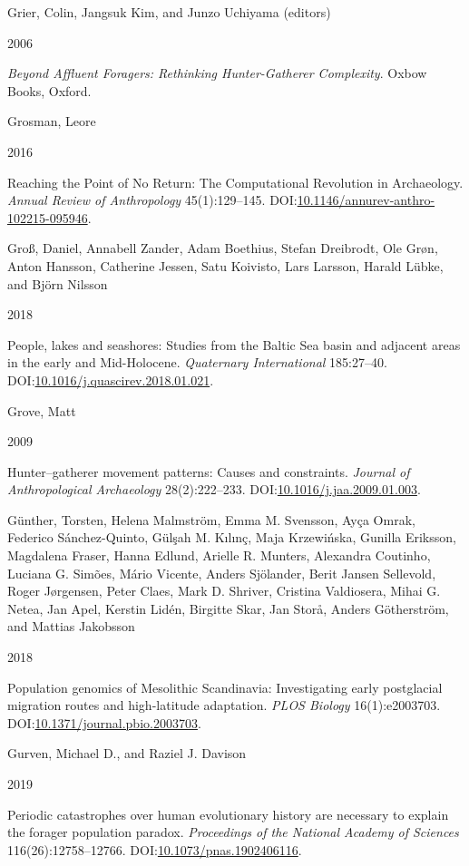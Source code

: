 \documentclass[
  12pt,
  a4paper,
  oneside]{book}
\newlength{\cslhangindent}
\newlength{\csllabelwidth}
\newlength{\cslentryspacingunit} %
\newenvironment{CSLReferences}[2] %
 {%
  \setlength{\parindent}{0pt}
  \ifodd #1
  \let\oldpar\par
  \def\par{\hangindent=\cslhangindent\oldpar}
  \fi
  \setlength{\parskip}{#2\cslentryspacingunit}
 }%
 {}
\newcommand{\CSLBlock}[1]{#1\hfill\break}
\newcommand{\CSLLeftMargin}[1]{\parbox[t]{\csllabelwidth}{#1}}
\newcommand{\CSLRightInline}[1]{\parbox[t]{\linewidth - \csllabelwidth}{#1}\break}
\begin{document}
\begin{CSLReferences}{0}{0}
\leavevmode{}%
\CSLBlock{Grier, Colin, Jangsuk Kim, and Junzo Uchiyama (editors)}
\CSLLeftMargin{ 2006}
\CSLRightInline{\emph{{Beyond Affluent Foragers: Rethinking Hunter-Gatherer Complexity}}. Oxbow Books, Oxford.}

\leavevmode{}%
\CSLBlock{Grosman, Leore}
\CSLLeftMargin{ 2016}
\CSLRightInline{{Reaching the Point of No Return: The Computational Revolution in Archaeology}. \emph{Annual Review of Anthropology} 45(1):129--145. DOI:\href{https://doi.org/10.1146/annurev-anthro-102215-095946}{10.1146/annurev-anthro-102215-095946}.}

\leavevmode{}%
\CSLBlock{Groß, Daniel, Annabell Zander, Adam Boethius, Stefan Dreibrodt, Ole Grøn, Anton Hansson, Catherine Jessen, Satu Koivisto, Lars Larsson, Harald Lübke, and Björn Nilsson}
\CSLLeftMargin{ 2018}
\CSLRightInline{People, lakes and seashores: Studies from the Baltic Sea basin and adjacent areas in the early and Mid-Holocene. \emph{Quaternary International} 185:27--40. DOI:\href{https://doi.org/10.1016/j.quascirev.2018.01.021}{10.1016/j.quascirev.2018.01.021}.}

\leavevmode{}%
\CSLBlock{Grove, Matt}
\CSLLeftMargin{ 2009}
\CSLRightInline{{Hunter--gatherer movement patterns: Causes and constraints}. \emph{Journal of Anthropological Archaeology} 28(2):222--233. DOI:\href{https://doi.org/10.1016/j.jaa.2009.01.003}{10.1016/j.jaa.2009.01.003}.}

\leavevmode{}%
\CSLBlock{Günther, Torsten, Helena Malmström, Emma M. Svensson, Ayça Omrak, Federico Sánchez-Quinto, Gülşah M. Kılınç, Maja Krzewińska, Gunilla Eriksson, Magdalena Fraser, Hanna Edlund, Arielle R. Munters, Alexandra Coutinho, Luciana G. Simões, Mário Vicente, Anders Sjölander, Berit Jansen Sellevold, Roger Jørgensen, Peter Claes, Mark D. Shriver, Cristina Valdiosera, Mihai G. Netea, Jan Apel, Kerstin Lidén, Birgitte Skar, Jan Storå, Anders Götherström, and Mattias Jakobsson}
\CSLLeftMargin{ 2018}
\CSLRightInline{Population genomics of Mesolithic Scandinavia: Investigating early postglacial migration routes and high-latitude adaptation. \emph{PLOS Biology} 16(1):e2003703. DOI:\href{https://doi.org/10.1371/journal.pbio.2003703}{10.1371/journal.pbio.2003703}.}

\leavevmode{}%
\CSLBlock{Gurven, Michael D., and Raziel J. Davison}
\CSLLeftMargin{ 2019}
\CSLRightInline{Periodic catastrophes over human evolutionary history are necessary to explain the forager population paradox. \emph{Proceedings of the National Academy of Sciences} 116(26):12758--12766. DOI:\href{https://doi.org/10.1073/pnas.1902406116}{10.1073/pnas.1902406116}.}


\end{CSLReferences}
\end{document}
